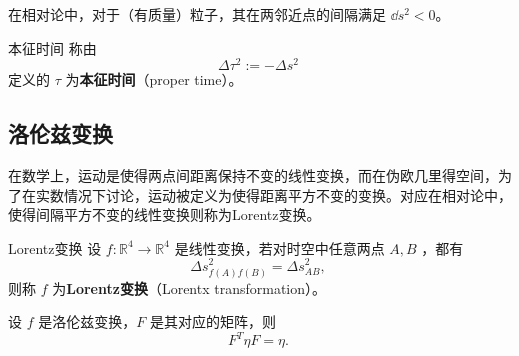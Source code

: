 在相对论中，对于（有质量）粒子，其在两邻近点的间隔满足 $\dd s^2<0$。
\begin{definition}{本征时间}
称由
\begin{equation}
\Delta \tau^2:=-\Delta s^2~
\end{equation}
定义的 $\tau$ 为\textbf{本征时间}（proper time）。
\end{definition}

\subsection{洛伦兹变换}
在数学上，运动是使得两点间距离保持不变的线性变换，而在伪欧几里得空间，为了在实数情况下讨论，运动被定义为使得距离平方不变的变换。对应在相对论中，使得间隔平方不变的线性变换则称为Lorentz变换。
\begin{definition}{Lorentz变换}
设 $f:\mathbb R^4\rightarrow\mathbb R^4$ 是线性变换，若对时空中任意两点 $A,B$ ，都有
\begin{equation}
\Delta s^2_{f(A)f(B)}=\Delta s^2_{AB},~
\end{equation}
则称 $f$ 为\textbf{Lorentz变换}（Lorentx transformation）。
\end{definition}

\begin{theorem}{}
设 $f$ 是洛伦兹变换，$F$ 是其对应的矩阵，则
\begin{equation}
F^T\eta F=\eta.~
\end{equation} 
\end{theorem}





















